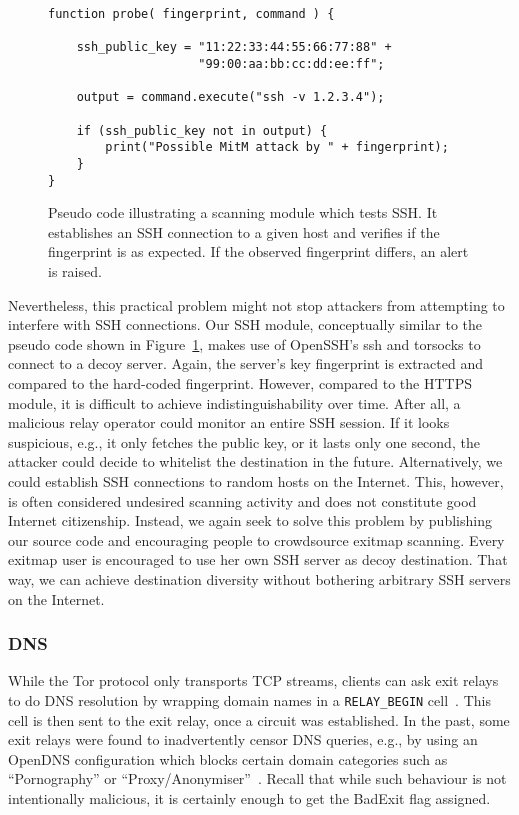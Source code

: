 \documentclass[letterpaper,twocolumn,10pt]{article}
\begin{document}
\begin{figure}
\begin{lstlisting}
function probe( fingerprint, command ) {

    ssh_public_key = "11:22:33:44:55:66:77:88" +
                     "99:00:aa:bb:cc:dd:ee:ff";

    output = command.execute("ssh -v 1.2.3.4");

    if (ssh_public_key not in output) {
        print("Possible MitM attack by " + fingerprint);
    }
}
\end{lstlisting}
\caption{Pseudo code illustrating a scanning module which tests SSH.  It establishes an SSH
	connection to a given host and verifies if the fingerprint is as expected.  If the observed
	fingerprint differs, an alert is raised.}
\label{lst:ssh}
\end{figure}

Nevertheless, this practical problem might not stop attackers from attempting to interfere with SSH
connections.  Our SSH module, conceptually similar to the pseudo code shown in Figure~\ref{lst:ssh},
makes use of OpenSSH's \textsf{ssh} and \textsf{torsocks} to connect to a decoy server.  Again, the
server's key fingerprint is extracted and compared to the hard-coded fingerprint.  However, compared
to the HTTPS module, it is difficult to achieve indistinguishability over time.  After all, a
malicious relay operator could monitor an entire SSH session.  If it looks suspicious, e.g., it only
fetches the public key, or it lasts only one second, the attacker could decide to whitelist the
destination in the future.  Alternatively, we could establish SSH connections to random hosts on the
Internet.  This, however, is often considered undesired scanning activity and does not constitute
good Internet citizenship.  Instead, we again seek to solve this problem by publishing our source
code and encouraging people to crowdsource \textsf{exitmap} scanning.  Every \textsf{exitmap} user
is encouraged to use her own SSH server as decoy destination.  That way, we can achieve destination
diversity without bothering arbitrary SSH servers on the Internet.

\subsubsection{DNS}
While the Tor protocol only transports TCP streams, clients can ask exit relays to do DNS resolution
by wrapping domain names in a \texttt{RELAY\_BEGIN} cell~\cite{torspec}.  This cell is then sent to
the exit relay, once a circuit was established.  In the past, some exit relays were found to
inadvertently censor DNS queries, e.g., by using an OpenDNS configuration which blocks certain
domain categories such as ``Pornography'' or ``Proxy/Anonymiser''~\cite{badexits}.  Recall that
while such behaviour is not intentionally malicious, it is certainly enough to get the BadExit flag
assigned.
\end{document}

